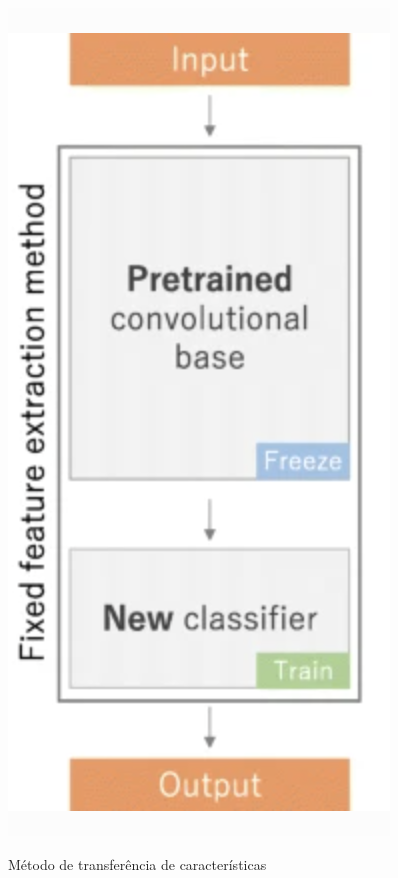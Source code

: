 \documentclass[
	12pt,				%
	oneside,			%
	a4paper,			%
	english,			%
	brazil				%
	]{abntex2ppgsi}
\begin{document}
\begin{figure}[H]
    \centering
    \caption{Método de transferência de características}
    \includegraphics[scale=.55]{imagens/conceitos_basicos/fixed_features_extraction.png}
    \label{fig:fixed_features_extraction}
\end{figure}
\end{document}
